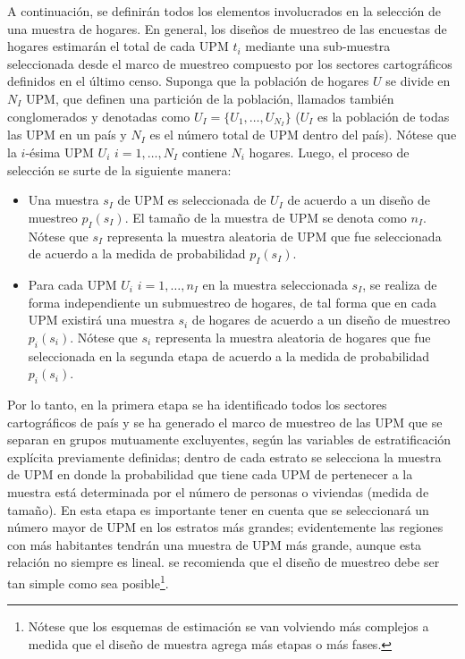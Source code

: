 \documentclass[
  12pt,
]{book}
\providecommand{\tightlist}{%
  \setlength{\itemsep}{0pt}\setlength{\parskip}{0pt}}
\begin{document}
A continuación, se definirán todos los elementos involucrados en la selección de una muestra de hogares. En general, los diseños de muestreo de las encuestas de hogares estimarán el total de cada UPM \(t_i\) mediante una sub-muestra seleccionada desde el marco de muestreo compuesto por los sectores cartográficos definidos en el último censo. Suponga que la población de hogares \(U\) se divide en \(N_I\) UPM, que definen una partición de la población, llamados también conglomerados y denotadas como \(U_I=\{U_1,\ldots,U_{N_I}\}\) (\(U_I\) es la población de todas las UPM en un país y \(N_I\) es el número total de UPM dentro del país). Nótese que la \(i\)-ésima UPM \(U_i\) \(i=1,\dots,N_I\) contiene \(N_i\) hogares. Luego, el proceso de selección se surte de la siguiente manera:

\begin{itemize}
\tightlist
\item
  Una muestra \(s_I\) de UPM es seleccionada de \(U_I\) de acuerdo a un diseño de muestreo \(p_I(s_I)\). El tamaño de la muestra de UPM se denota como \(n_I\). Nótese que \(s_I\) representa la muestra aleatoria de UPM que fue seleccionada de acuerdo a la medida de probabilidad \(p_I(s_I)\).
\item
  Para cada UPM \(U_i\) \(i=1,\dots,n_I\) en la muestra seleccionada \(s_I\), se realiza de forma independiente un submuestreo de hogares, de tal forma que en cada UPM existirá una muestra \(s_i\) de hogares de acuerdo a un diseño de muestreo \(p_i(s_i)\). Nótese que \(s_i\) representa la muestra aleatoria de hogares que fue seleccionada en la segunda etapa de acuerdo a la medida de probabilidad \(p_i(s_i)\).
\end{itemize}

Por lo tanto, en la primera etapa se ha identificado todos los sectores cartográficos de país y se ha generado el marco de muestreo de las UPM que se separan en grupos mutuamente excluyentes, según las variables de estratificación explícita previamente definidas; dentro de cada estrato se selecciona la muestra de UPM en donde la probabilidad que tiene cada UPM de pertenecer a la muestra está determinada por el número de personas o viviendas (medida de tamaño). En esta etapa es importante tener en cuenta que se seleccionará un número mayor de UPM en los estratos más grandes; evidentemente las regiones con más habitantes tendrán una muestra de UPM más grande, aunque esta relación no siempre es lineal. se recomienda que el diseño de muestreo debe ser tan simple como sea posible\footnote{Nótese que los esquemas de estimación se van volviendo más complejos a medida que el diseño de muestra agrega más etapas o más fases.}.
\end{document}
